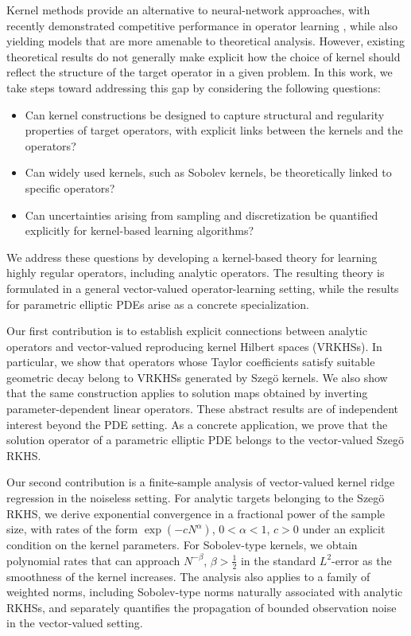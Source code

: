 \documentclass[11pt]{article}
\numberwithin{equation}{section}
\theoremstyle{plain}
\theoremstyle{definition}
\theoremstyle{remark}
\begin{document}
Kernel methods provide an alternative to neural-network approaches, with
recently demonstrated competitive performance in operator learning
\cite{batlle2024kernel}, while
also yielding models that are more amenable to theoretical analysis. However,
existing theoretical results do not generally make explicit how the choice of
kernel should reflect the structure of the target operator in a given problem.
In this work, we take steps toward addressing this gap by considering the
following questions:
\begin{itemize}
\item Can kernel constructions be designed to capture structural and
regularity properties of target operators, with explicit links between the
kernels and the operators?
\item Can widely used kernels, such as Sobolev kernels, be theoretically linked
to specific operators?
\item Can uncertainties arising from sampling and discretization be quantified
explicitly for kernel-based learning algorithms?
\end{itemize}
We address these questions by developing a kernel-based theory for learning
highly regular operators, including analytic operators. The resulting theory
is formulated in a general vector-valued operator-learning setting, while the
results for parametric elliptic PDEs arise as a concrete specialization.

Our
first contribution is to establish explicit connections between analytic
operators and vector-valued reproducing kernel Hilbert spaces (VRKHSs). In particular,
we show that operators whose Taylor coefficients satisfy suitable
geometric decay belong to VRKHSs generated by Szegö kernels. We also show that
the same construction applies to solution maps obtained by inverting
parameter-dependent linear operators. These abstract results are of
independent interest beyond the PDE setting. As a concrete application, we prove that
the solution operator of a parametric elliptic PDE belongs to the
 vector-valued Szegö RKHS.

Our second contribution is a finite-sample analysis of vector-valued kernel
ridge regression in the noiseless setting. For analytic targets belonging to
the Szegö RKHS, we derive exponential convergence in a fractional power of the
sample size, with rates of the form $\exp(-cN^{\alpha})$, $0<\alpha <1$, $c>0$ under an explicit
condition on the kernel parameters. For Sobolev-type kernels, we obtain
polynomial rates that can approach $N^{-\beta}$, $\beta >\frac12$ in the standard $L^2$-error as
the smoothness of the kernel increases. The analysis also applies to a family
of weighted norms, including Sobolev-type norms naturally associated with
analytic RKHSs, and separately quantifies the propagation of bounded
observation noise in the vector-valued setting.
\end{document}
